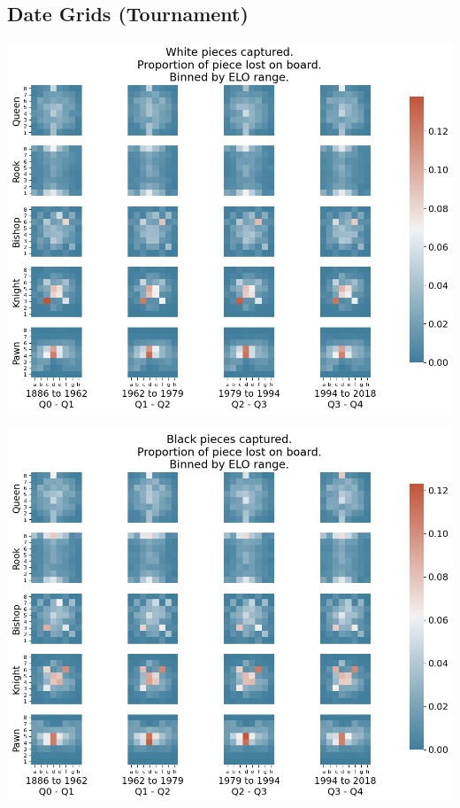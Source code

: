 \documentclass[11pt]{article}
\begin{document}
\subsection{Date Grids (Tournament)}
\label{sec:org23de98f}
\begin{center}
\includegraphics[width=\textwidth]{Images/_HEATMAP_Queen_Rook_Bishop_Knight_Pawn_WHITE_DATE_TOURNEMENTS.png}
\end{center}

\begin{center}
\includegraphics[width=\textwidth]{Images/_HEATMAP_Queen_Rook_Bishop_Knight_Pawn_BLACK_DATE_TOURNEMENTS.png}
\end{center}
\end{document}
